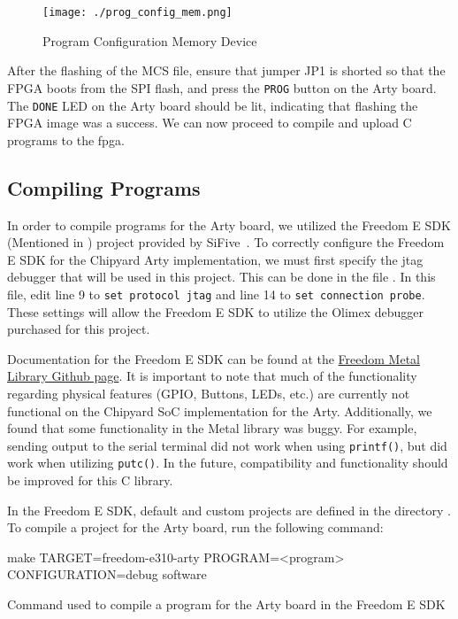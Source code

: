 \begin{figure}[h!tbp]
  \centering
  \texttt{[image: ./prog\_config\_mem.png]}
  \caption{Program Configuration Memory Device}
  \label{fig:prog_config_mem}
\end{figure}

After the flashing of the MCS file, ensure that jumper JP1 is shorted so that the FPGA boots from the SPI flash, and press the \texttt{PROG} button on the Arty board.
The \texttt{DONE} LED on the Arty board should be lit, indicating that flashing the FPGA image was a success.
We can now proceed to compile and upload C programs to the \Gls{fpga}.

\subsection{Compiling Programs}\label{sec:Compiling_Programs}
In order to compile programs for the Arty board, we utilized the Freedom E SDK (Mentioned in ) project provided by SiFive~\cite{freedomESDK}.
To correctly configure the Freedom E SDK for the Chipyard Arty implementation, we must first specify the \Gls{jtag} debugger that will be used in this project.
This can be done in the file .
In this file, edit line 9 to \texttt{set protocol jtag} and line 14 to \texttt{set connection probe}.
These settings will allow the Freedom E SDK to utilize the Olimex debugger purchased for this project.

Documentation for the Freedom E SDK can be found at the \href{https://sifive.github.io/freedom-metal-docs/}{Freedom Metal Library Github page}.
It is important to note that much of the functionality regarding physical features (GPIO, Buttons, LEDs, etc.) are currently not functional on the Chipyard SoC implementation for the Arty.
Additionally, we found that some functionality in the Metal library was buggy.
For example, sending output to the serial terminal did not work when using \texttt{printf()}, but did work when utilizing \texttt{putc()}.
In the future, compatibility and functionality should be improved for this C library.

In the Freedom E SDK, default and custom projects are defined in the directory .
To compile a project for the Arty board, run the following command:

\begin{listing}[h!tbp]
  \begin{bashsource}
    make TARGET=freedom-e310-arty PROGRAM=<program> CONFIGURATION=debug software
  \end{bashsource}
  \caption{Command used to compile a program for the Arty board in the Freedom E SDK}
  \label{lst:compile_in_sdk}
\end{listing}

